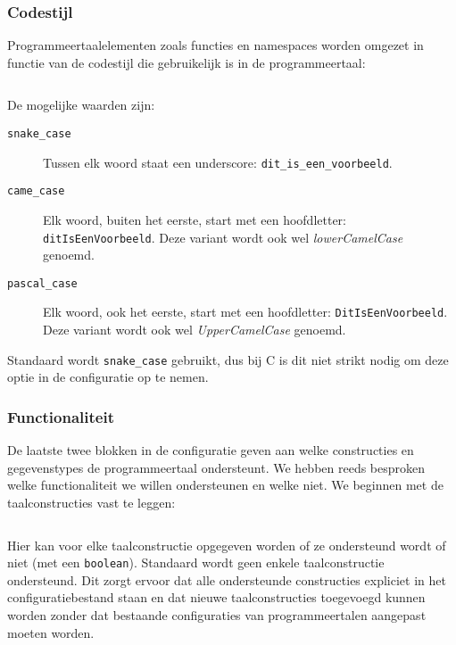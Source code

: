 \inputminted[firstline=2,lastline=14,gobble=2]{js}{sources/c-config.json}

\subsubsection{Codestijl}

Programmeertaalelementen zoals functies en namespaces worden omgezet in functie van de codestijl die gebruikelijk is in de programmeertaal:

\inputminted[firstline=15,lastline=18,gobble=2]{js}{sources/c-config.json}

De mogelijke waarden zijn:

\begin{description}
    \item[\texttt{snake\_case}] Tussen elk woord staat een underscore: \texttt{dit\_is\_een\_voorbeeld}.
    \item[\texttt{came\_case}] Elk woord, buiten het eerste, start met een hoofdletter: \texttt{ditIsEenVoorbeeld}.
    Deze variant wordt ook wel \emph{lowerCamelCase} genoemd.
    \item[\texttt{pascal\_case}] Elk woord, ook het eerste, start met een hoofdletter: \texttt{DitIsEenVoorbeeld}.
    Deze variant wordt ook wel \emph{UpperCamelCase} genoemd.
\end{description}

Standaard wordt \texttt{snake\_case} gebruikt, dus bij C is dit niet strikt nodig om deze optie in de configuratie op te nemen.

\subsubsection{Functionaliteit}

De laatste twee blokken in de configuratie geven aan welke constructies en gegevenstypes de programmeertaal ondersteunt.
We hebben reeds besproken welke functionaliteit we willen ondersteunen en welke niet.
We beginnen met de taalconstructies vast te leggen:

\inputminted[firstline=19,lastline=27,gobble=2]{js}{sources/c-config.json}

Hier kan voor elke taalconstructie opgegeven worden of ze ondersteund wordt of niet (met een \texttt{boolean}).
Standaard wordt geen enkele taalconstructie ondersteund.
Dit zorgt ervoor dat alle ondersteunde constructies expliciet in het configuratiebestand staan en dat nieuwe taalconstructies toegevoegd kunnen worden zonder dat bestaande configuraties van programmeertalen aangepast moeten worden.

